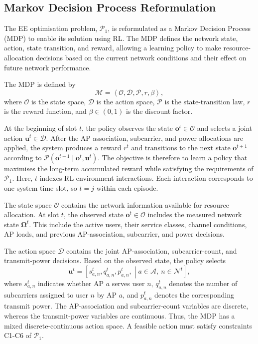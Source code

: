 \documentclass[journal]{IEEEtran}
\begin{document}
\subsection{Markov Decision Process Reformulation}

The EE optimisation problem, $\mathcal{P}_{1}$, is reformulated as a Markov Decision Process (MDP) to enable its solution using RL. The MDP defines the network state, action, state transition, and reward, allowing a learning policy to make resource-allocation decisions based on the current network conditions and their effect on future network performance.

The MDP is defined by
\begin{equation}
\mathcal{M}
=
\left\langle
\mathcal{O},\mathcal{D},\mathcal{P},r,\beta
\right\rangle,
\label{eq:mdp}
\end{equation}
where $\mathcal{O}$ is the state space, $\mathcal{D}$ is the action space, $\mathcal{P}$ is the state-transition law, $r$ is the reward function, and $\beta\in(0,1)$ is the discount factor.

At the beginning of slot $t$, the policy observes the state $\mathbf{o}^{t}\in\mathcal{O}$ and selects a joint action $\mathbf{u}^{t}\in\mathcal{D}$. After the AP association, subcarrier, and power allocations are applied, the system produces a reward $r^{t}$ and transitions to the next state $\mathbf{o}^{t+1}$ according to $\mathcal{P}(\mathbf{o}^{t+1}\mid\mathbf{o}^{t},\mathbf{u}^{t})$.
The objective is therefore to learn a policy that maximises the long-term accumulated reward while satisfying the requirements of $\mathcal{P}_{1}$. Here, $t$ indexes RL environment interactions. Each interaction corresponds to one system time slot, so $t=j$ within each episode.

The state space $\mathcal{O}$ contains the network information
available for resource allocation. At slot $t$, the observed state $\mathbf{o}^{t}\in\mathcal{O}$ includes the measured network state
$\boldsymbol{\Omega}^{t}$. This include the active users, their service classes, channel conditions, AP loads, and previous AP-association, subcarrier, and power
decisions.

The action space $\mathcal{D}$ contains the joint AP-association, subcarrier-count, and transmit-power decisions. Based on the observed state, the policy selects
\begin{equation}
\mathbf{u}^{t}
=
\left[
s_{a,n}^{t},q_{a,n}^{t},p_{a,n}^{t}
,\middle|
a\in\mathcal{A},\ n\in\mathcal{N}^{t}
\right],
\label{eq:mdp_action}
\end{equation}
where $s_{a,n}^{t}$ indicates whether AP $a$ serves user $n$, $q_{a,n}^{t}$ denotes the number of subcarriers assigned to user $n$ by AP $a$, and $p_{a,n}^{t}$ denotes the corresponding transmit power. The AP-association and subcarrier-count variables are discrete, whereas the transmit-power variables are continuous. Thus, the MDP
has a mixed discrete-continuous action space. A feasible action must satisfy constraints C1-C6 of $\mathcal{P}_{1}$.
\end{document}
